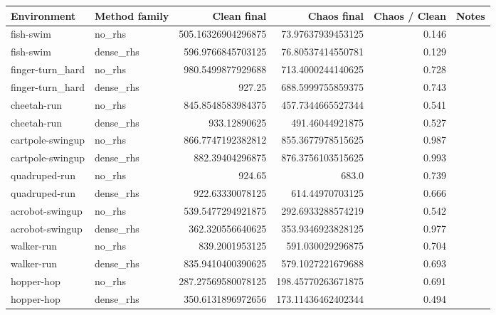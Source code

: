 \begin{tabular}{llrrrr}
\toprule
Environment & Method family & Clean final & Chaos final & Chaos / Clean & Notes \\
\midrule
fish-swim & no\_rhs & 505.16326904296875 & 73.97637939453125 & 0.146 &  \\
fish-swim & dense\_rhs & 596.9766845703125 & 76.80537414550781 & 0.129 &  \\
finger-turn\_hard & no\_rhs & 980.5499877929688 & 713.4000244140625 & 0.728 &  \\
finger-turn\_hard & dense\_rhs & 927.25 & 688.5999755859375 & 0.743 &  \\
cheetah-run & no\_rhs & 845.8548583984375 & 457.7344665527344 & 0.541 &  \\
cheetah-run & dense\_rhs & 933.12890625 & 491.46044921875 & 0.527 &  \\
cartpole-swingup & no\_rhs & 866.7747192382812 & 855.3677978515625 & 0.987 &  \\
cartpole-swingup & dense\_rhs & 882.39404296875 & 876.3756103515625 & 0.993 &  \\
quadruped-run & no\_rhs & 924.65 & 683.0 & 0.739 &  \\
quadruped-run & dense\_rhs & 922.63330078125 & 614.44970703125 & 0.666 &  \\
acrobot-swingup & no\_rhs & 539.5477294921875 & 292.6933288574219 & 0.542 &  \\
acrobot-swingup & dense\_rhs & 362.320556640625 & 353.9346923828125 & 0.977 &  \\
walker-run & no\_rhs & 839.2001953125 & 591.030029296875 & 0.704 &  \\
walker-run & dense\_rhs & 835.9410400390625 & 579.1027221679688 & 0.693 &  \\
hopper-hop & no\_rhs & 287.27569580078125 & 198.45770263671875 & 0.691 &  \\
hopper-hop & dense\_rhs & 350.6131896972656 & 173.11436462402344 & 0.494 &  \\
\bottomrule
\end{tabular}
